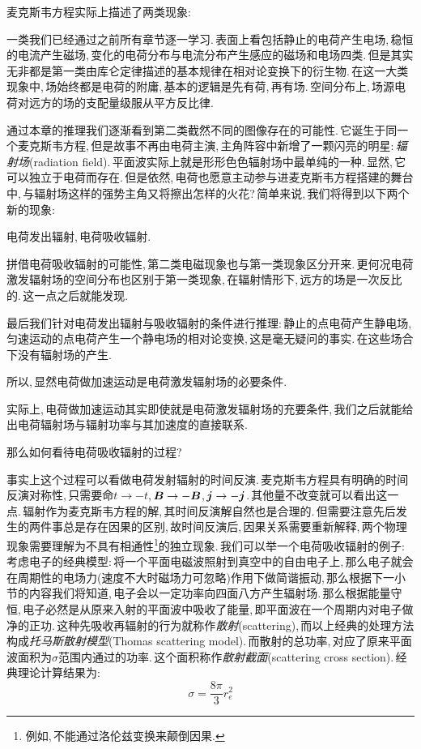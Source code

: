 麦克斯韦方程实际上描述了两类现象:

一类我们已经通过之前所有章节逐一学习.\,表面上看包括静止的电荷产生电场,\,稳恒的电流产生磁场,\,变化的电荷分布与电流分布产生感应的磁场和电场四类.\,但是其实无非都是第一类由库仑定律描述的基本规律在相对论变换下的衍生物.\,在这一大类现象中,\,场始终都是电荷的附庸,\,基本的逻辑是先有荷,\,再有场.\,空间分布上,\,场源电荷对远方的场的支配量级服从平方反比律.

通过本章的推理我们逐渐看到第二类截然不同的图像存在的可能性.\,它诞生于同一个麦克斯韦方程,\,但是故事不再由电荷主演,\,主角阵容中新增了一颗闪亮的明星:\,\emph{辐射场}(radiation field).\,平面波实际上就是形形色色辐射场中最单纯的一种.\,显然,\,它可以独立于电荷而存在.\,但是依然,\,电荷也愿意主动参与进麦克斯韦方程搭建的舞台中,\,与辐射场这样的强势主角又将擦出怎样的火花?\,简单来说,\,我们将得到以下两个新的现象:\,

电荷发出辐射,\,电荷吸收辐射.

拼借电荷吸收辐射的可能性,\,第二类电磁现象也与第一类现象区分开来.\,更何况电荷激发辐射场的空间分布也区别于第一类现象,\,在辐射情形下,\,远方的场是一次反比的.\,这一点之后就能发现.

最后我们针对电荷发出辐射与吸收辐射的条件进行推理:\,静止的点电荷产生静电场,\,匀速运动的点电荷产生一个静电场的相对论变换,\,这是毫无疑问的事实.\,在这些场合下没有辐射场的产生.

所以,\,显然电荷做加速运动是电荷激发辐射场的必要条件.

实际上,\,电荷做加速运动其实即使就是电荷激发辐射场的充要条件,\,我们之后就能给出电荷辐射场与辐射功率与其加速度的直接联系.

那么如何看待电荷吸收辐射的过程?

事实上这个过程可以看做电荷发射辐射的时间反演.\,麦克斯韦方程具有明确的时间反演对称性,\,只需要命$t\to -t$,\,$\boldsymbol{B}\to -\boldsymbol{B}$,\,$\boldsymbol{j}\to -\boldsymbol{j}$.\,其他量不改变就可以看出这一点.\,辐射作为麦克斯韦方程的解,\,其时间反演解自然也是合理的.\,但需要注意先后发生的两件事总是存在因果的区别,\,故时间反演后,\,因果关系需要重新解释,\,两个物理现象需要理解为不具有相通性\footnote{例如,\,不能通过洛伦兹变换来颠倒因果.}的独立现象.\,我们可以举一个电荷吸收辐射的例子:\,考虑电子的经典模型:\,将一个平面电磁波照射到真空中的自由电子上,\,那么电子就会在周期性的电场力(速度不大时磁场力可忽略)作用下做简谐振动,\,那么根据下一小节的内容我们将知道,\,电子会以一定功率向四面八方产生辐射场.\,那么根据能量守恒,\,电子必然是从原来入射的平面波中吸收了能量,\,即平面波在一个周期内对电子做净的正功.\,这种先吸收再辐射的行为就称作\emph{散射}(scattering),\,而以上经典的处理方法构成\emph{托马斯散射模型}(Thomas scattering model).\,而散射的总功率,\,对应了原来平面波面积为$\sigma$范围内通过的功率.\,这个面积称作\emph{散射截面}(scattering cross section).\,经典理论计算结果为:
\[\sigma=\frac{8\pi}{3}r_e^2\]

